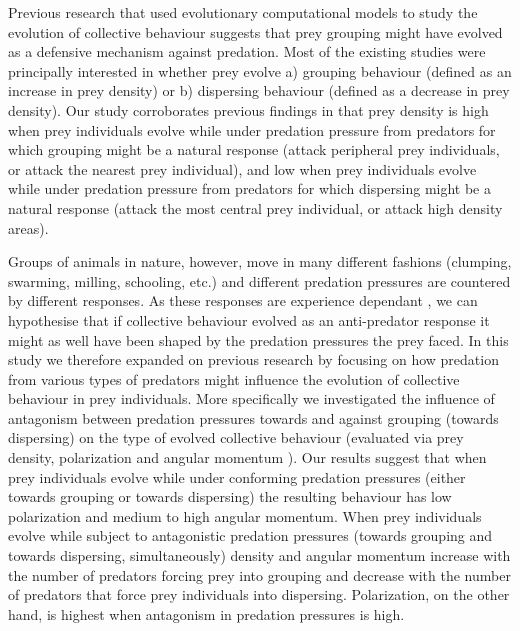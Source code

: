 Previous research that used evolutionary computational models to study the evolution of collective behaviour \cite{biswas2014causes,kunz2006prey,morrell2015consequences,olson2013predator,olson2016evolution} suggests that prey grouping might have evolved as a defensive mechanism against predation. Most of the existing studies were principally interested in whether prey evolve a) grouping behaviour (defined as an increase in prey density) or b) dispersing behaviour (defined as a decrease in prey density). Our study corroborates previous findings in that prey density is high when prey individuals evolve while under predation pressure from predators for which grouping might be a natural response (attack peripheral prey individuals, or attack the nearest prey individual), and low when prey individuals evolve while under predation pressure from predators for which dispersing might be a natural response (attack the most central prey individual, or attack high density areas).

Groups of animals in nature, however, move in many different fashions (clumping, swarming, milling, schooling, etc.) \cite{krause2002living,suzuki1973movement} and different predation pressures are countered by different responses. As these responses are experience dependant \cite{elmasri2012response,hellstrom2016balancing}, we can hypothesise that if collective behaviour evolved as an anti-predator response it might as well have been shaped by the predation pressures the prey faced. In this study we therefore expanded on previous research by focusing on how predation from various types of predators might influence the evolution of collective behaviour in prey individuals. More specifically we investigated the influence of antagonism between predation pressures towards and against grouping (towards dispersing) on the type of evolved collective behaviour (evaluated via prey density, polarization and angular momentum \cite{couzin2002collective}). Our results suggest that when prey individuals evolve while under conforming predation pressures (either towards grouping or towards dispersing) the resulting behaviour has low polarization and medium to high angular momentum. When prey individuals evolve while subject to antagonistic predation pressures (towards grouping and towards dispersing, simultaneously) density and angular momentum increase with the number of predators forcing prey into grouping and decrease with the number of predators that force prey individuals into dispersing. Polarization, on the other hand, is highest when antagonism in predation pressures is high.

